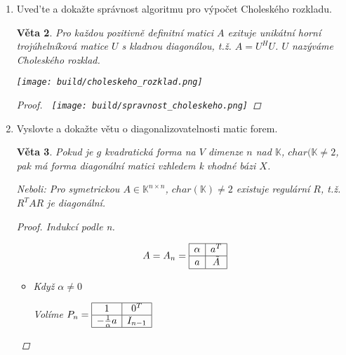 \documentclass[10pt,a4paper]{article}
\theoremstyle{plain}
\newtheorem{veta}{Věta}
\begin{document}
\begin{enumerate}
\begin{veta} [Sylvesterova podmínka]
Kde $A_i$ je hlavní podmatice $A$, neboli prvních $i$ řádků a sloupců $A$.
\begin{proof}
Použijeme Gaussovu eliminaci $A \sim ... \sim A^\prime$ pro test, zda je $A$ pozitivně definitní. Nechť $\alpha_1, ..., \alpha_n$ jsou prvky na diagonále $A^\prime$. Protože jsme eliminovali řádky shora dolů, máme
\[ \det(A_i) = \det(A^\prime_i) = \prod_{j \leq i} \alpha_j = \det(A_{i-1})\alpha_i \]

\[A \text{ je pozitivně definitní } \iff \alpha_1, ..., \alpha_n > 0 \iff \det(A_1), ..., \det(A_n) > 0 \]
\end{proof}
\end{veta}

\item Uved'te a dokažte správnost algoritmu pro výpočet Choleského rozkladu.

 
\begin{veta}
Pro každou pozitivně definitní matici $A$ exituje unikátní horní trojúhelníková matice $U$ s kladnou diagonálou, t.ž. $A = U^HU$. $U$ nazýváme Choleského rozklad.


\texttt{[image: build/choleskeho\_rozklad.png]}
\begin{proof}$\ $
 \texttt{[image: build/spravnost\_choleskeho.png]} 
\end{proof}
\end{veta}

\item Vyslovte a dokažte větu o diagonalizovatelnosti matic forem.

\begin{veta}
Pokud je $g$ kvadratická forma na $V$ dimenze $n$ nad $\mathbb{K}$, $char(\mathbb{K} \neq 2$, pak má forma diagonální matici vzhledem k vhodné bázi $X$.

Neboli: Pro symetrickou $A \in \mathbb{K}^{n \times n}$, $char(\mathbb{K}) \neq 2$ existuje regulární $R$, t.ž. $R^TAR$ je diagonální.
\begin{proof} 
Indukcí podle n.

\[ A = A_n = \begin{array}{|c|c|} \hline  \alpha & a^T  \\ \hline  a & \tilde{A} \\ \hline \end{array} \] \begin{itemize}

\item Když $\alpha \neq 0$

Volíme $P_n = \begin{array}{|c|c|} \hline  1 & 0^T  \\ \hline  -\frac{1}{\alpha}a & I_{n-1} \\ \hline \end{array} $


\end{itemize}
\end{proof}
\end{veta}
\end{enumerate}
\end{document}

